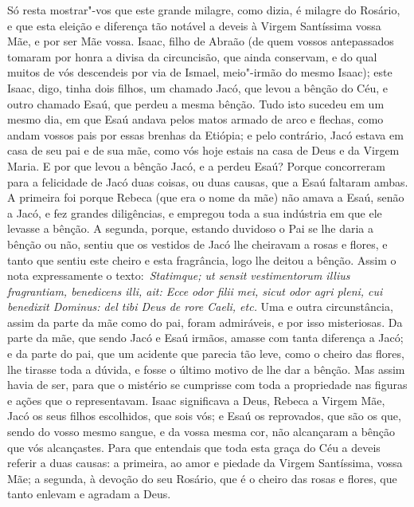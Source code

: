 Só resta mostrar"-vos que este grande milagre, como dizia, é
milagre do Rosário, e que esta eleição e diferença tão notável a deveis
à Virgem Santíssima vossa Mãe, e por ser Mãe vossa. Isaac, filho de
Abraão (de quem vossos antepassados tomaram por honra a divisa da
circuncisão, que ainda conservam, e do qual muitos de vós descendeis por
via de Ismael, meio"-irmão do mesmo Isaac); este Isaac, digo, tinha
dois filhos, um chamado Jacó, que levou a bênção do Céu, e outro chamado
Esaú, que perdeu a mesma bênção. Tudo isto sucedeu em um mesmo dia, em
que Esaú andava pelos matos armado de arco e flechas, como andam vossos
pais por essas brenhas da Etiópia; e pelo contrário, Jacó estava em casa
de seu pai e de sua mãe, como vós hoje estais na casa de Deus e da
Virgem Maria. E por que levou a bênção Jacó, e a perdeu Esaú? Porque
concorreram para a felicidade de Jacó duas coisas, ou duas causas, que a
Esaú faltaram ambas. A primeira foi porque Rebeca (que era o nome da
mãe) não amava a Esaú, senão a Jacó, e fez grandes diligências, e
empregou toda a sua indústria em que ele levasse a bênção. A segunda,
porque, estando duvidoso o Pai se lhe daria a bênção ou não, sentiu que
os vestidos de Jacó lhe cheiravam a rosas e flores, e tanto que sentiu
este cheiro e esta fragrância, logo lhe deitou a bênção. Assim o nota
expressamente o texto:~\emph{Statimque; ut sensit vestimentorum illius
fragrantiam, benedicens illi, ait: Ecce odor filii mei, sicut odor agri
pleni, cui benedixit Dominus: del tibi Deus de rore Caeli,
etc.} Uma e outra circunstância, assim da parte da mãe
como do pai, foram admiráveis, e por isso misteriosas. Da parte da mãe,
que sendo Jacó e Esaú irmãos, amasse com tanta diferença a Jacó; e da
parte do pai, que um acidente que parecia tão leve, como o cheiro das
flores, lhe tirasse toda a dúvida, e fosse o último motivo de lhe dar a
bênção. Mas assim havia de ser, para que o mistério se cumprisse com
toda a propriedade nas figuras e ações que o representavam. Isaac
significava a Deus, Rebeca a Virgem Mãe, Jacó os seus filhos escolhidos,
que sois vós; e Esaú os reprovados, que são os que, sendo do vosso mesmo
sangue, e da vossa mesma cor, não alcançaram a bênção que vós
alcançastes. Para que entendais que toda esta graça do Céu a deveis
referir a duas causas: a primeira, ao amor e piedade da Virgem
Santíssima, vossa Mãe; a segunda, à devoção do seu Rosário, que é o
cheiro das rosas e flores, que tanto enlevam e agradam a Deus.

